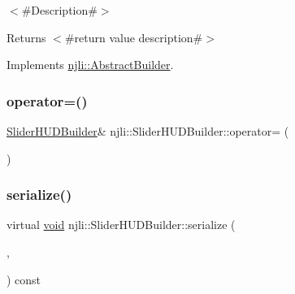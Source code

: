 $<$\#\+Description\#$>$

\begin{DoxyReturn}{Returns}
$<$\#return value description\#$>$ 
\end{DoxyReturn}


Implements \mbox{\hyperlink{classnjli_1_1_abstract_builder_a3e6e553e06d1ca30517ad5fb0bd4d000}{njli\+::\+Abstract\+Builder}}.

\mbox{\label{classnjli_1_1_slider_h_u_d_builder_a5e75bed3ec8b1934facaa3a9125e429c}} 
\subsubsection{\texorpdfstring{operator=()}{operator=()}}
{\footnotesize\ttfamily \mbox{\hyperlink{classnjli_1_1_slider_h_u_d_builder}{Slider\+H\+U\+D\+Builder}}\& njli\+::\+Slider\+H\+U\+D\+Builder\+::operator= (\begin{DoxyParamCaption}\item[{const \mbox{\hyperlink{classnjli_1_1_slider_h_u_d_builder}{Slider\+H\+U\+D\+Builder}} \&}]{ }\end{DoxyParamCaption})\hspace{0.3cm}{\ttfamily [protected]}}

\mbox{\label{classnjli_1_1_slider_h_u_d_builder_a35671014401438dceb5e1468c4fcff24}} 
\subsubsection{\texorpdfstring{serialize()}{serialize()}}
{\footnotesize\ttfamily virtual \mbox{\hyperlink{_thread_8h_af1e856da2e658414cb2456cb6f7ebc66}{void}} njli\+::\+Slider\+H\+U\+D\+Builder\+::serialize (\begin{DoxyParamCaption}\item[{\mbox{\hyperlink{_thread_8h_af1e856da2e658414cb2456cb6f7ebc66}{void}} $\ast$}]{,  }\item[{bt\+Serializer $\ast$}]{ }\end{DoxyParamCaption}) const\hspace{0.3cm}{\ttfamily [virtual]}}

